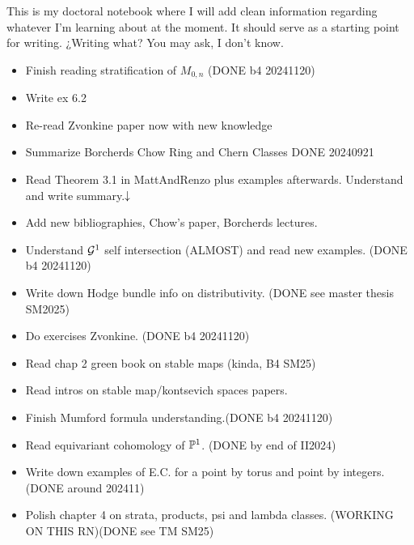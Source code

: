\documentclass[12pt]{memoir}
\author{\nauthor}
\begin{document}
{\small
\setlength{\parindent}{0em}
\setlength{\parskip}{1em}

This is my doctoral notebook where I will add clean information regarding whatever I'm learning about at the moment. It should serve as a starting point for writing. ¿Writing what? You may ask, I don't know.

\begin{itemize}
    \item Finish reading stratification of \(M_{0,n}\) (DONE b4 20241120)
    \item Write ex 6.2
    \item Re-read Zvonkine paper now with new knowledge
    \item Summarize Borcherds Chow Ring and Chern Classes DONE 20240921
\end{itemize}
\begin{itemize}
    \item Read Theorem 3.1 in MattAndRenzo plus examples afterwards. Understand and write summary.\(\downarrow\)
    \item Add new bibliographies, Chow's paper, Borcherds lectures.
\end{itemize}
\begin{itemize}
    \item Understand \(\mathcal{G}^1\) self intersection (ALMOST) and read new examples. (DONE b4 20241120)
    \item Write down Hodge bundle info on distributivity. (DONE see master thesis SM2025)
    \item Do exercises Zvonkine. (DONE b4 20241120)
\end{itemize}
\begin{itemize}
    \item Read chap 2 green book on stable maps (kinda, B4 SM25)
    \item Read intros on stable map/kontsevich spaces papers.
    \item Finish Mumford formula understanding.(DONE b4 20241120)
\end{itemize}
\begin{itemize}
    \item Read equivariant cohomology of \(\mathbb{P}^1\). (DONE by end of II2024)
    \item Write down examples of E.C. for a point by torus and point by integers. (DONE around 202411)
    \item Polish chapter 4 on strata, products, psi and lambda classes. (WORKING ON THIS RN)(DONE see TM SM25)

\end{itemize}}
\end{document}
